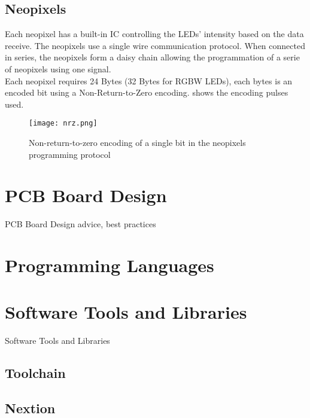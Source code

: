 \subsection{Neopixels}
Each neopixel has a built-in IC controlling the LEDs' intensity based on the data receive. The neopixels use a single wire communication protocol. When connected in series, the neopixels form a daisy chain allowing the programmation of a serie of neopixels using one signal. \\
Each neopixel requires 24 Bytes (32 Bytes for RGBW LEDs), each bytes is an encoded bit using a Non-Return-to-Zero encoding.  shows the encoding pulses used.  
\begin{figure}[ht]
\centering
\texttt{[image: nrz.png]}
\caption{Non-return-to-zero encoding of a single bit in the neopixels programming protocol}
\label{fig:nrz}
\end{figure}
    
\section{PCB Board Design}
PCB Board Design
advice, best practices

\section{Programming Languages}



\section{Software Tools and Libraries}
Software Tools and Libraries 
\subsection{Toolchain}
\subsection{Nextion}
